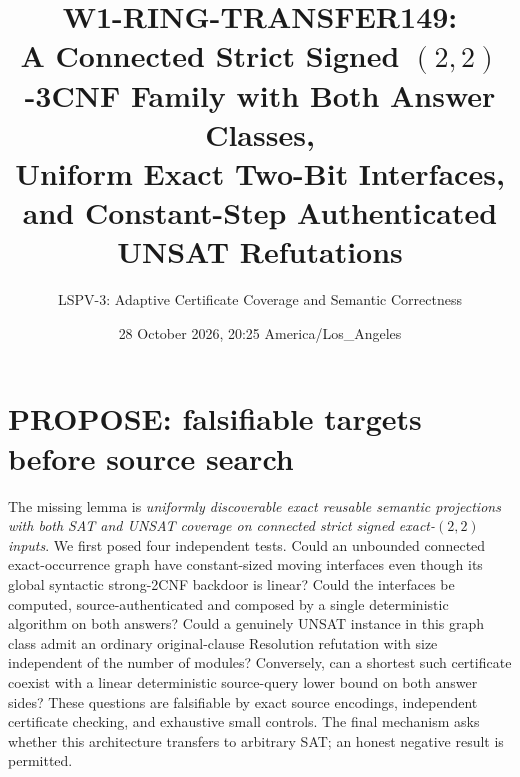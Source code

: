 \documentclass[11pt]{article}
\title{W1-RING-TRANSFER149:\\A Connected Strict Signed $(2,2)$-3CNF Family with Both Answer Classes,\\ Uniform Exact Two-Bit Interfaces, and Constant-Step Authenticated UNSAT Refutations}
\author{LSPV-3: Adaptive Certificate Coverage and Semantic Correctness}
\date{28 October 2026, 20:25 America/Los\_Angeles}
\begin{document}
\maketitle
\begin{center}\end{center}

\section{PROPOSE: falsifiable targets before source search}
The missing lemma is \emph{uniformly discoverable exact reusable semantic projections with both SAT and UNSAT coverage on connected strict signed exact-$(2,2)$ inputs}. We first posed four independent tests. Could an unbounded connected exact-occurrence graph have constant-sized moving interfaces even though its global syntactic strong-2CNF backdoor is linear? Could the interfaces be computed, source-authenticated and composed by a single deterministic algorithm on both answers? Could a genuinely UNSAT instance in this graph class admit an ordinary original-clause Resolution refutation with size independent of the number of modules? Conversely, can a shortest such certificate coexist with a linear deterministic source-query lower bound on both answer sides? These questions are falsifiable by exact source encodings, independent certificate checking, and exhaustive small controls. The final mechanism asks whether this architecture transfers to arbitrary SAT; an honest negative result is permitted.
\end{document}
